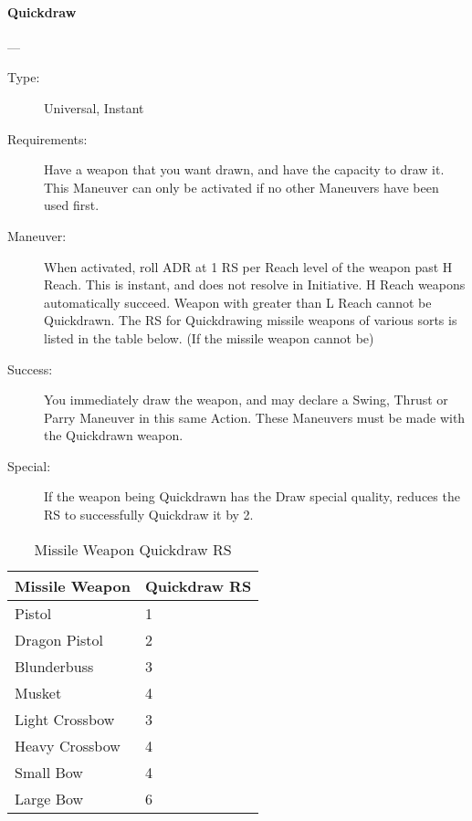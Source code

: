 \documentclass[oneside,11pt,english]{book}
\begin{document}
\paragraph{\large\label{man:Quickdraw}Quickdraw}---\quad{\large[1]}
\vspace{-10pt}\begin{description} 
\item [Type:] Universal, Instant 
\item [Requirements:] Have a weapon that you want drawn, and have the capacity to draw it. This Maneuver can only be activated if no other Maneuvers have been used first.
\item [Maneuver:] When activated, roll ADR at 1 RS per Reach level of the weapon past H Reach. This is instant, and does not resolve in Initiative. H Reach weapons automatically succeed. Weapon with greater than L Reach cannot be Quickdrawn.
  The RS for Quickdrawing missile weapons of various sorts is listed in the table below. (If the missile weapon cannot be)
\item [Success:] You immediately draw the weapon, and may declare a Swing, Thrust or Parry Maneuver in this same Action. These Maneuvers must be made with the Quickdrawn weapon. 
\item [Special:] If the weapon being Quickdrawn has the Draw special quality, reduces the RS to successfully Quickdraw it by 2. 
\end{description}
\begin{table}[!ht]
  \centering
  \caption{Missile Weapon Quickdraw RS}
  \label{tab:Quickdraw RS Missile Weapons}
  \begin{tabu} spread 0pt{XX}
    Missile Weapon &Quickdraw RS \\\toprule
    Pistol &1 \\
    Dragon Pistol& 2 \\
    Blunderbuss &3 \\
    Musket &4 \\
    Light Crossbow &3 \\
    Heavy Crossbow &4 \\
    Small Bow &4 \\
    Large Bow &6 \\
  \end{tabu}
\end{table}
\end{document}
